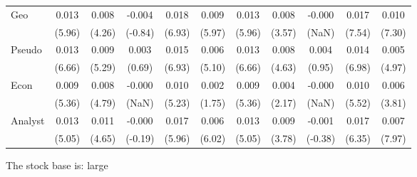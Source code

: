 \documentclass[
]{article}
\begin{document}
\begin{table}[H]
{\begin{tabular}{lcccccccccc}
  Geo & 0.013 & 0.008 & -0.004 & 0.018 & 0.009 & 0.013 & 0.008 & -0.000 & 0.017 & 0.010 \\ 
   & (5.96) & (4.26) & (-0.84) & (6.93) & (5.97) & (5.96) & (3.57) & (NaN) & (7.54) & (7.30) \\ 
  Pseudo & 0.013 & 0.009 & 0.003 & 0.015 & 0.006 & 0.013 & 0.008 & 0.004 & 0.014 & 0.005 \\ 
   & (6.66) & (5.29) & (0.69) & (6.93) & (5.10) & (6.66) & (4.63) & (0.95) & (6.98) & (4.97) \\ 
  Econ & 0.009 & 0.008 & -0.000 & 0.010 & 0.002 & 0.009 & 0.004 & -0.000 & 0.010 & 0.006 \\ 
   & (5.36) & (4.79) & (NaN) & (5.23) & (1.75) & (5.36) & (2.17) & (NaN) & (5.52) & (3.81) \\ 
  Analyst & 0.013 & 0.011 & -0.000 & 0.017 & 0.006 & 0.013 & 0.009 & -0.001 & 0.017 & 0.007 \\ 
   & (5.05) & (4.65) & (-0.19) & (5.96) & (6.02) & (5.05) & (3.78) & (-0.38) & (6.35) & (7.97) \\ 
   \hline 
\end{tabular}
}
\end{table}

The stock base is: large
\end{document}
